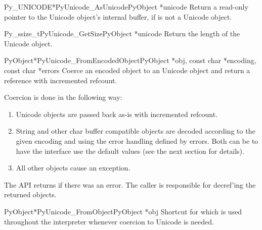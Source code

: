 \begin{cfuncdesc}{Py_UNICODE*}{PyUnicode_AsUnicode}{PyObject *unicode}
  Return a read-only pointer to the Unicode object's internal
   buffer, \NULL{} if  is not a Unicode
  object.
\end{cfuncdesc}

\begin{cfuncdesc}{Py_ssize_t}{PyUnicode_GetSize}{PyObject *unicode}
  Return the length of the Unicode object.
\end{cfuncdesc}

\begin{cfuncdesc}{PyObject*}{PyUnicode_FromEncodedObject}{PyObject *obj,
                                                      const char *encoding,
                                                      const char *errors}
  Coerce an encoded object  to an Unicode object and return a
  reference with incremented refcount.

  Coercion is done in the following way:

\begin{enumerate}
\item  Unicode objects are passed back as-is with incremented
       refcount. 

\item String and other char buffer compatible objects are decoded
      according to the given encoding and using the error handling
      defined by errors.  Both can be \NULL{} to have the interface
      use the default values (see the next section for details).

\item All other objects cause an exception.
\end{enumerate}

  The API returns \NULL{} if there was an error.  The caller is
  responsible for decref'ing the returned objects.
\end{cfuncdesc}

\begin{cfuncdesc}{PyObject*}{PyUnicode_FromObject}{PyObject *obj}
  Shortcut for 
  which is used throughout the interpreter whenever coercion to
  Unicode is needed.
\end{cfuncdesc}


